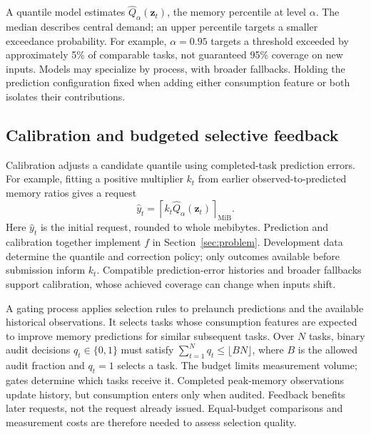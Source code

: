 \label{sec:quantiles}
A quantile model estimates $\widehat Q_\alpha(\mathbf{z}_t)$, the memory
percentile at level $\alpha$. The median describes central demand; an
upper percentile targets a smaller exceedance probability. For example,
$\alpha=0.95$ targets a threshold exceeded by approximately 5\% of comparable
tasks, not guaranteed 95\% coverage on new inputs. Models may specialize
by process, with broader fallbacks. Holding the prediction configuration
fixed when adding either consumption feature or both isolates their contributions.

\subsection{Calibration and budgeted selective feedback}
\label{sec:calibration}
Calibration adjusts a candidate quantile using completed-task prediction errors.
For example, fitting a positive multiplier $k_t$ from earlier
observed-to-predicted memory ratios gives a request
\begin{equation}
\hat y_t=\left\lceil k_t\widehat Q_\alpha(\mathbf{z}_t)\right\rceil_{\mathrm{MiB}}.
\label{eq:general_request}
\end{equation}
Here $\hat y_t$ is the initial request, rounded to whole mebibytes.
Prediction and calibration together implement $f$ in Section~\ref{sec:problem}.
Development data determine the quantile and correction policy; only
outcomes available before submission inform $k_t$. Compatible prediction-error
histories and broader fallbacks support calibration, whose achieved
coverage can change when inputs shift.

\label{sec:gates}
A gating process applies selection rules to prelaunch predictions and
the available historical observations. It selects tasks whose consumption features are expected
to improve memory predictions for similar subsequent tasks. Over $N$ tasks,
binary audit decisions $q_t\in\{0,1\}$ must satisfy
$\sum_{t=1}^{N}q_t\leq\lfloor BN\rfloor$, where $B$ is the allowed audit
fraction and $q_t=1$ selects a task.
The budget limits measurement volume; gates determine which tasks receive
it. Completed peak-memory observations update history, but consumption
enters only when audited. Feedback benefits later requests, not the
request already issued. Equal-budget comparisons and measurement costs
are therefore needed to assess selection quality.

